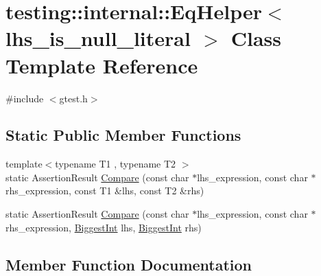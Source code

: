 \hypertarget{classtesting_1_1internal_1_1EqHelper}{}\section{testing\+::internal\+::Eq\+Helper$<$ lhs\+\_\+is\+\_\+null\+\_\+literal $>$ Class Template Reference}
\label{classtesting_1_1internal_1_1EqHelper}


{\ttfamily \#include $<$gtest.\+h$>$}

\subsection*{Static Public Member Functions}
\begin{DoxyCompactItemize}
\item 
{\footnotesize template$<$typename T1 , typename T2 $>$ }\\static Assertion\+Result \mbox{\hyperlink{classtesting_1_1internal_1_1EqHelper_ae3572c7374534a916b9117efaa89f33f}{Compare}} (const char $\ast$lhs\+\_\+expression, const char $\ast$rhs\+\_\+expression, const T1 \&lhs, const T2 \&rhs)
\item 
static Assertion\+Result \mbox{\hyperlink{classtesting_1_1internal_1_1EqHelper_aaa42c0059bb3dcc43d556243febb5f1c}{Compare}} (const char $\ast$lhs\+\_\+expression, const char $\ast$rhs\+\_\+expression, \mbox{\hyperlink{namespacetesting_1_1internal_a05c6bd9ede5ccdf25191a590d610dcc6}{Biggest\+Int}} lhs, \mbox{\hyperlink{namespacetesting_1_1internal_a05c6bd9ede5ccdf25191a590d610dcc6}{Biggest\+Int}} rhs)
\end{DoxyCompactItemize}


\subsection{Member Function Documentation}
\mbox{\label{classtesting_1_1internal_1_1EqHelper_ae3572c7374534a916b9117efaa89f33f}} 
